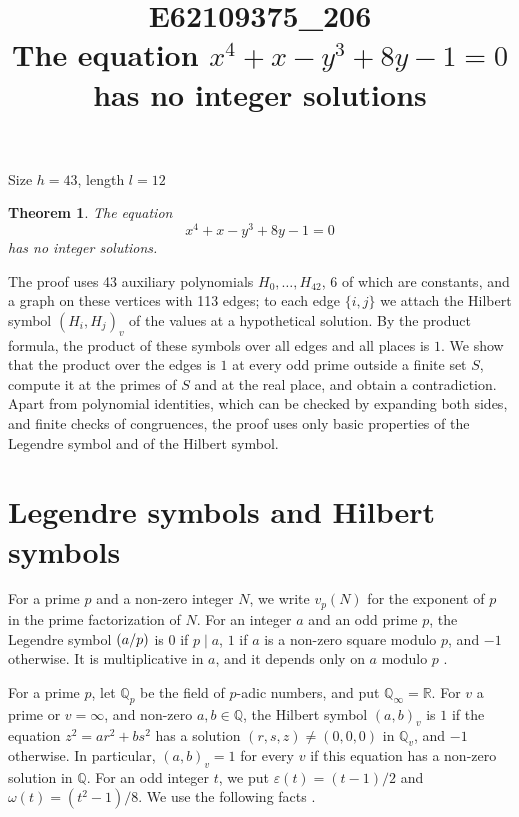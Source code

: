 \documentclass[11pt]{article}
\title{\textbf{E62109375\_206}\\[4pt] {\Large The equation $x^{4}+x-y^{3}+8y-1=0$ has no integer solutions}}
\author{}
\date{}
\newtheorem{theorem}{Theorem}
\newcommand{\Q}{\mathbb{Q}}
\newcommand{\leg}[2]{\mathchoice{\biggl(\dfrac{#1}{#2}\biggr)}{(#1/#2)}{(#1/#2)}{(#1/#2)}}
\begin{document}
\maketitle
\vspace{-8ex}
\begin{center}
Size $h=43$, length $l=12$
\end{center}

\begin{theorem}\label{thm:main}
The equation
\begin{equation}\label{eq:main}
x^{4}+x-y^{3}+8y-1=0
\end{equation}
has no integer solutions.
\end{theorem}

The proof uses 43 auxiliary polynomials $H_0,\dots,H_{42}$, 6 of which are constants, and a graph on these vertices with 113 edges; to each edge $\{i,j\}$ we attach the Hilbert symbol $(H_i,H_j)_v$ of the values at a hypothetical solution. By the product formula, the product of these symbols over all edges and all places is $1$. We show that the product over the edges is $1$ at every odd prime outside a finite set $S$, compute it at the primes of $S$ and at the real place, and obtain a contradiction. Apart from polynomial identities, which can be checked by expanding both sides, and finite checks of congruences, the proof uses only basic properties of the Legendre symbol and of the Hilbert symbol.

\section{Legendre symbols and Hilbert symbols}

For a prime $p$ and a non-zero integer $N$, we write $v_p(N)$ for the exponent of $p$ in the prime factorization of $N$. For an integer $a$ and an odd prime $p$, the Legendre symbol $\leg{a}{p}$ is $0$ if $p\mid a$, $1$ if $a$ is a non-zero square modulo $p$, and $-1$ otherwise. It is multiplicative in $a$, and it depends only on $a$ modulo $p$ \cite[Chapter~5]{IR}.

For a prime $p$, let $\Q_p$ be the field of $p$-adic numbers, and put $\Q_\infty=\mathbb R$. For $v$ a prime or $v=\infty$, and non-zero $a,b\in\Q$, the Hilbert symbol $(a,b)_v$ is $1$ if the equation $z^2=ar^2+bs^2$ has a solution $(r,s,z)\neq(0,0,0)$ in $\Q_v$, and $-1$ otherwise. In particular, $(a,b)_v=1$ for every $v$ if this equation has a non-zero solution in $\Q$. For an odd integer $t$, we put $\varepsilon(t)=(t-1)/2$ and $\omega(t)=(t^2-1)/8$. We use the following facts \cite[Chapter~III, Proposition~2 and Theorems~1 and~3]{Se}.
\end{document}
